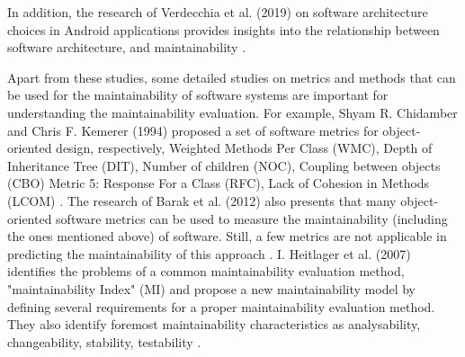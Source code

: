 In addition, the research of Verdecchia et al. (2019) on software architecture choices in Android applications provides insights into the relationship between software architecture, and maintainability \cite{14}.

Apart from these studies, some detailed studies on metrics and methods that can be used for the maintainability of software systems are important for understanding the maintainability evaluation. For example, Shyam R. Chidamber and Chris F. Kemerer (1994) proposed a set of software metrics for object-oriented design, respectively, Weighted Methods Per Class (WMC), Depth of Inheritance Tree (DIT), Number of children (NOC), Coupling between objects (CBO) Metric 5: Response For a Class (RFC), Lack of Cohesion in Methods (LCOM) \cite{36}. The research of Barak et al. (2012) also presents that many object-oriented software metrics can be used to measure the maintainability (including the ones mentioned above) of software. Still, a few metrics are not applicable in predicting the maintainability of this approach \cite{33}. I. Heitlager et al. (2007) identifies the problems of a common maintainability evaluation method, "maintainability Index" (MI) and propose a new maintainability model by defining several requirements for a proper maintainability evaluation method. They also identify foremost maintainability characteristics as analysability, changeability, stability, testability \cite{45}.